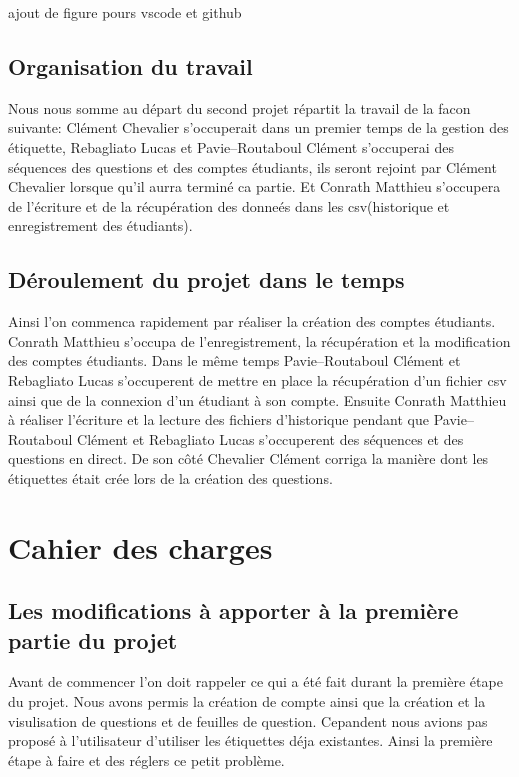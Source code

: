 \documentclass[a4paper, 12pt]{article}
\begin{document}
ajout de figure pours vscode et github
\subsection{Organisation du travail}
Nous nous somme au départ du second projet répartit la travail de la facon 
suivante: Clément Chevalier s'occuperait dans un premier temps de la gestion
des étiquette,
Rebagliato Lucas et Pavie--Routaboul Clément s'occuperai des séquences des 
questions et des comptes étudiants, ils seront rejoint par Clément Chevalier
lorsque qu'il
aurra terminé ca partie. Et Conrath Matthieu s'occupera de l'écriture et de la
récupération des donneés dans les csv(historique et enregistrement des 
étudiants).
\subsection{Déroulement du projet dans le temps}
Ainsi l'on commenca rapidement par réaliser la création des comptes étudiants.
Conrath Matthieu s'occupa de l'enregistrement, la récupération et la 
modification des
comptes étudiants. Dans le même temps Pavie--Routaboul Clément et Rebagliato
Lucas s'occuperent de mettre en place la récupération d'un fichier csv ainsi
que de la
connexion d'un étudiant à son compte. Ensuite Conrath Matthieu à réaliser 
l'écriture et la lecture des fichiers d'historique pendant que Pavie--Routaboul
Clément et
Rebagliato Lucas s'occuperent des séquences et des questions en direct. De son 
côté Chevalier Clément corriga la manière dont les étiquettes était crée lors
de la création des questions.   

\section{Cahier des charges}
\subsection{Les modifications à apporter à la première partie du projet}
Avant de commencer l'on doit rappeler ce qui a été fait durant la première étape
du projet. Nous avons permis la création de compte ainsi que la création et la
visulisation de questions et de feuilles de question. Cepandent nous avions pas
proposé à l'utilisateur d'utiliser les étiquettes déja existantes. Ainsi la 
première
étape à faire et des réglers ce petit problème.
\end{document}
